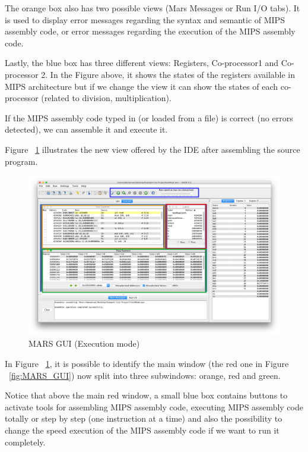 \documentclass[
  oneside,
  11pt, a4paper,
  footinclude=true,
  headinclude=true,
  cleardoublepage=empty
]{scrbook}
\begin{document}
The orange box also has two possible views (Mars Messages or Run I/O tabs). It is used to display error messages regarding the syntax and semantic of MIPS assembly code, or error messages regarding the execution of the MIPS assembly code.

Lastly, the blue box has three different views: Registers, Co-processor1 and Co-processor 2. In the Figure above, it shows the states of the registers available in MIPS architecture but if we change the view it can show the states of each co-processor (related to division, multiplication).


If the MIPS assembly code typed in (or loaded from a file) is correct (no errors detected), we can assemble it and execute it.

Figure ~\ref{fig:MARS_GUI_EXECUTE} illustrates the new view offered by the IDE after assembling the source program.

\begin{figure}[h!]
  \centering
    \includegraphics[width=1\textwidth]{img/MARS_GUI_EXECUTE.png}
    \caption{MARS GUI (Execution mode)}
    \label{fig:MARS_GUI_EXECUTE}
\end{figure}

In Figure ~\ref{fig:MARS_GUI_EXECUTE},  it is possible to identify the main window (the red one in Figure ~\ref{fig:MARS_GUI}) now split into three subwindows: orange, red and green. 

Notice that above the main red window, a small blue box contains buttons to activate tools for assembling MIPS assembly code, executing MIPS assembly code totally or step by step (one instruction at a time) and also the possibility to change the speed execution of the MIPS assembly code if we want to run it completely.
\end{document}
